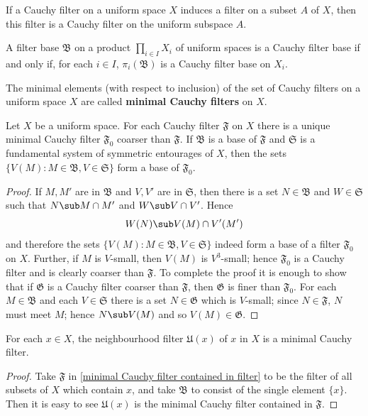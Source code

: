 \begin{corollary}
If a Cauchy filter on a uniform space $X$ induces a filter on a subset $A$ of $X$, then this filter is a Cauchy filter on the uniform subspace $A$.
\end{corollary}
\begin{corollary}\label{filter Cauchy product space iff}
A filter base $\mathfrak{B}$ on a product $\prod_{i\in I}X_i$ of uniform spaces is a Cauchy filter base if and only if, for each $i\in I$, $\pi_i(\mathfrak{B})$ is a Cauchy filter base on $X_i$.
\end{corollary}
The minimal elements (with respect to inclusion) of the set of Cauchy filters on a uniform space $X$ are called \textbf{minimal Cauchy filters} on $X$.
\begin{proposition}\label{minimal Cauchy filter contained in filter}
Let $X$ be a uniform space. For each Cauchy filter $\mathfrak{F}$ on $X$ there is a unique minimal Cauchy filter $\mathfrak{F}_0$ coarser than $\mathfrak{F}$. If $\mathfrak{B}$ is a base of $\mathfrak{F}$ and $\mathfrak{S}$ is a fundamental system of symmetric entourages of $X$, then the sets $\{V(M):M\in\mathfrak{B},V\in\mathfrak{S}\}$ form a base of $\mathfrak{F}_0$.
\end{proposition}
\begin{proof}
If $M,M'$ are in $\mathfrak{B}$ and $V,V'$ are in $\mathfrak{S}$, then there is a set $N\in\mathfrak{B}$ and $W\in\mathfrak{S}$ such that $N\sub M\cap M'$ and $W\sub V\cap V'$. Hence
\[W(N)\sub V(M)\cap V'(M')\]
and therefore the sets $\{V(M):M\in\mathfrak{B},V\in\mathfrak{S}\}$ indeed form a base of a filter $\mathfrak{F}_0$ on $X$. Further, if $M$ is $V$-small, then $V(M)$ is $V^3$-small; hence $\mathfrak{F}_0$ is a Cauchy filter and is clearly coarser than $\mathfrak{F}$. To complete the proof it is enough to show that if $\mathfrak{G}$ is a Cauchy filter coarser than $\mathfrak{F}$, then $\mathfrak{G}$ is finer than $\mathfrak{F}_0$. For each $M\in\mathfrak{B}$ and each $V\in\mathfrak{S}$ there is a set $N\in\mathfrak{G}$ which is $V$-small; since $N\in\mathfrak{F}$, $N$ must meet $M$; hence $N\sub V(M)$ and so $V(M)\in\mathfrak{G}$.
\end{proof}
\begin{corollary}\label{filter nbdh is minimal}
For each $x\in X$, the neighbourhood filter $\mathfrak{U}(x)$ of $x$ in $X$ is a minimal Cauchy filter.
\end{corollary}
\begin{proof}
Take $\mathfrak{F}$ in \cref{minimal Cauchy filter contained in filter} to be the filter of all subsets of $X$ which contain $x$, and take $\mathfrak{B}$ to consist of the single element $\{x\}$. Then it is easy to see $\mathfrak{U}(x)$ is the minimal Cauchy filter contained in $\mathfrak{F}$.
\end{proof}
